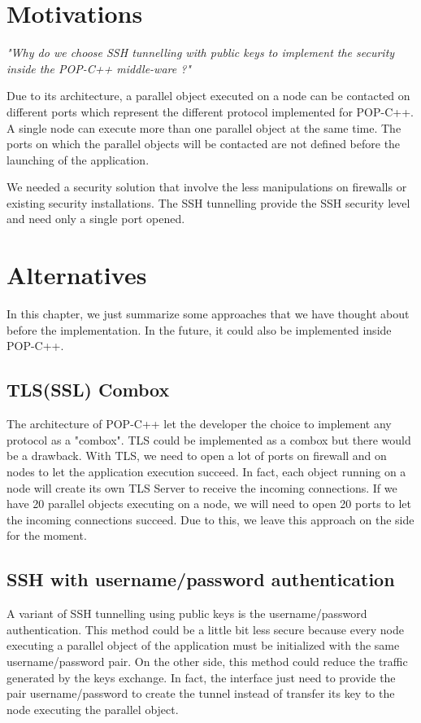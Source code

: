 \section{Motivations}
\textit{"Why do we choose SSH tunnelling with public keys to implement the security inside the POP-C++ middle-ware ?"}\s

Due to its architecture, a parallel object executed on a node can be contacted on different ports which represent the different protocol implemented for POP-C++. A single node can execute more than one parallel object at the same time. The ports on which the parallel objects will be contacted are not defined before the launching of the application.\s

We needed a security solution that involve the less manipulations on firewalls or existing security installations. The SSH tunnelling provide the SSH security level and need only a single port opened. 


\pagebreak
\section{Alternatives}
In this chapter, we just summarize some approaches that we have thought about before the implementation. In the future, it could also be implemented inside POP-C++. 

\subsection{TLS(SSL) Combox}
The architecture of POP-C++ let the developer the choice to implement any protocol as a "combox". TLS could be implemented as a combox but there would be a drawback. With TLS, we need to open a lot of ports on firewall and on nodes to let the application execution succeed. In fact, each object running on a node will create its own TLS Server to receive the incoming connections. If we have 20 parallel objects executing on a node, we will need to open 20 ports to let the incoming connections succeed. Due to this, we leave this approach on the side for the moment.

\subsection{SSH with username/password authentication}
A variant of SSH tunnelling using public keys is the username/password authentication. This method could be a little bit less secure because every node executing a parallel object of the application must be initialized with the same username/password pair. On the other side, this method could reduce the traffic generated by the keys exchange. In fact, the interface just need to provide the pair username/password to create the tunnel instead of transfer its key to the node executing the parallel object.


